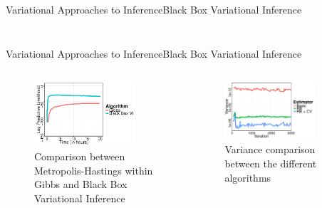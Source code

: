 \documentclass[AERbeamer%
              ,optEnglish%
              ,optBiber%
              ,optBibstyleAlphabetic%
              ,optBeamerClassicFormat%
              ]{AERlatex}%
\begin{document}
\begin{frame}[c]{Variational Approaches to Inference}{Black Box Variational Inference}
\begin{columns}[T]
\begin{column}{0.48\textwidth}
\begin{figure}
            \end{figure}
        \end{column}
    \end{columns}
\end{frame}


\begin{frame}[c]{Variational Approaches to Inference}{Black Box Variational Inference}
    \centering
    \begin{columns}[T]
        \begin{column}{0.48\textwidth}
            \begin{figure}
                \centering
                \includegraphics[width=0.85\textwidth]{ViBBVIPerformance1.png}
                \caption{Comparison between Metropolis-Hastings within Gibbs and Black Box Variational Inference}
            \end{figure}
        \end{column}
        \begin{column}{0.48\textwidth}
            \begin{figure}
                \centering
                \includegraphics[width=0.8\textwidth]{VIBBVIPerformance2.png}
                \caption{Variance comparison between the different algorithms}
            \end{figure}
        \end{column}
    \end{columns}
\end{frame}
\end{document}
